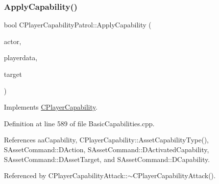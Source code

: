 \subsubsection{\texorpdfstring{Apply\+Capability()}{ApplyCapability()}}
{\footnotesize\ttfamily bool C\+Player\+Capability\+Patrol\+::\+Apply\+Capability (\begin{DoxyParamCaption}\item[{std\+::shared\+\_\+ptr$<$ \hyperlink{classCPlayerAsset}{C\+Player\+Asset} $>$}]{actor,  }\item[{std\+::shared\+\_\+ptr$<$ \hyperlink{classCPlayerData}{C\+Player\+Data} $>$}]{playerdata,  }\item[{std\+::shared\+\_\+ptr$<$ \hyperlink{classCPlayerAsset}{C\+Player\+Asset} $>$}]{target }\end{DoxyParamCaption})\hspace{0.3cm}{\ttfamily [virtual]}}



Implements \hyperlink{classCPlayerCapability_a2ca6fd7fbd9c0178f1cf1d049c63825f}{C\+Player\+Capability}.



Definition at line 589 of file Basic\+Capabilities.\+cpp.



References aa\+Capability, C\+Player\+Capability\+::\+Asset\+Capability\+Type(), S\+Asset\+Command\+::\+D\+Action, S\+Asset\+Command\+::\+D\+Activated\+Capability, S\+Asset\+Command\+::\+D\+Asset\+Target, and S\+Asset\+Command\+::\+D\+Capability.



Referenced by C\+Player\+Capability\+Attack\+::$\sim$\+C\+Player\+Capability\+Attack().


